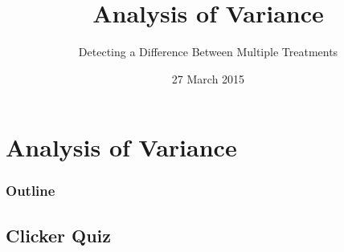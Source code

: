 \section{Analysis of Variance}

\title{Analysis of Variance}
\subtitle{Detecting a Difference Between Multiple Treatments}

\date{27 March 2015}

\begin{frame}
  \titlepage
\end{frame}

\begin{frame}
  \frametitle{Outline}
  \tableofcontents[hideothersubsections,sectionstyle=show/hide]
\end{frame}



\subsection{Clicker Quiz}

